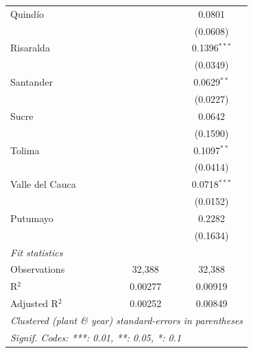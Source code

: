 \begin{tabular}{lcc}
   Quindío            &                & 0.0801\\   
                      &                & (0.0608)\\   
   Risaralda          &                & 0.1396$^{***}$\\   
                      &                & (0.0349)\\   
   Santander          &                & 0.0629$^{**}$\\   
                      &                & (0.0227)\\   
   Sucre              &                & 0.0642\\   
                      &                & (0.1590)\\   
   Tolima             &                & 0.1097$^{**}$\\   
                      &                & (0.0414)\\   
   Valle del Cauca    &                & 0.0718$^{***}$\\   
                      &                & (0.0152)\\   
   Putumayo           &                & 0.2282\\   
                      &                & (0.1634)\\   
   \midrule
   \emph{Fit statistics}\\
   Observations       & 32,388         & 32,388\\  
   R$^2$              & 0.00277        & 0.00919\\  
   Adjusted R$^2$     & 0.00252        & 0.00849\\  
   \midrule \midrule
   \multicolumn{3}{l}{\emph{Clustered (plant \& year) standard-errors in parentheses}}\\
   \multicolumn{3}{l}{\emph{Signif. Codes: ***: 0.01, **: 0.05, *: 0.1}}\\
\end{tabular}
\par\endgroup



